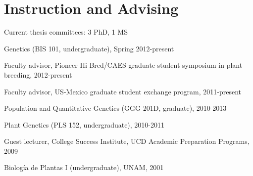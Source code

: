 \documentclass[letterpaper]{article}
\renewenvironment{itemize}{
  \begin{list}{}{
    \setlength{\leftmargin}{1.5em}
  }
}{
  \end{list}
}
\begin{document}
\section*{Instruction and Advising}
\begin{itemize}
\item Current thesis committees: 3 PhD, 1 MS
\item Genetics (BIS 101, undergraduate), Spring 2012-present
\item Faculty advisor, Pioneer Hi-Bred/CAES graduate student symposium in plant breeding, 2012-present
\item Faculty advisor, US-Mexico graduate student exchange program, 2011-present
\item Population and Quantitative Genetics (GGG 201D, graduate), 2010-2013 %
\item Plant Genetics (PLS 152, undergraduate), 2010-2011 %
\item Guest lecturer, College Success Institute, UCD Academic Preparation Programs, 2009
\item Biolog\'{i}a de Plantas I (undergraduate), UNAM, 2001
\end{itemize}
\end{document}
